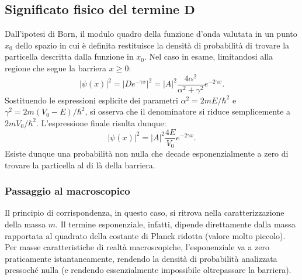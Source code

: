 \documentclass[a4paper,11pt]{report}
\begin{document}
\subsection{Significato fisico del termine $\bm{D}$}
Dall'ipotesi di Born, il modulo quadro della funzione d'onda valutata in un punto $x_0$ dello spazio in cui è definita restituisce la densità di probabilità di trovare la particella descritta dalla funzione in $x_0$. Nel caso in esame, limitandosi alla regione che segue la barriera $x \geq 0$:
\begin{equation}
    |\psi(x)|^2 = |D e^{-\gamma x}|^2 = |A|^2 \frac{4\alpha^2}{\alpha^2 + \gamma^2} e^{-2\gamma x}.
\end{equation}
Sostituendo le espressioni esplicite dei parametri $\alpha^2 = 2mE/\hbar^2$ e $\gamma^2 = 2m(V_0-E)/\hbar^2$, si osserva che il denominatore si riduce semplicemente a $2mV_0/\hbar^2$. L'espressione finale risulta dunque:
\begin{equation}
    |\psi(x)|^2 = |A|^2 \frac{4E}{V_0} e^{-2\gamma x}.
\end{equation}
Esiste dunque una probabilità non nulla che decade esponenzialmente a zero di trovare la particella al di là della barriera.

\subsubsection{Passaggio al macroscopico}
Il principio di corrispondenza, in questo caso, si ritrova nella caratterizzazione della massa $m$. Il termine esponenziale, infatti, dipende direttamente dalla massa rapportata al quadrato della costante di Planck ridotta (valore molto piccolo). Per masse caratteristiche di realtà macroscopiche, l'esponenziale va a zero praticamente istantaneamente, rendendo la densità di probabilità analizzata pressoché nulla (e rendendo essenzialmente impossibile oltrepassare la barriera).
\end{document}
